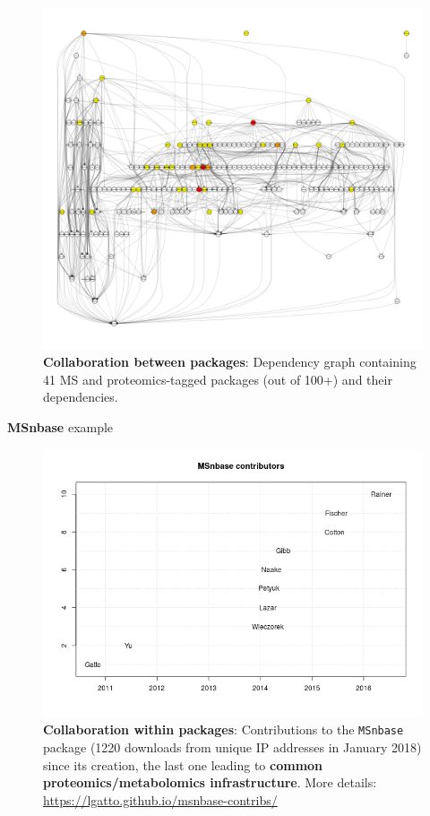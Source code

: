 \begin{frame}
  \begin{figure}[h]
    \centering
    \includegraphics[width=.8\linewidth]{./figs/g.png}
    \caption{\textbf{Collaboration between packages}: Dependency graph
      containing 41 MS and proteomics-tagged packages (out of 100+)
      and their dependencies. }
  \end{figure}
\end{frame}

\begin{frame}{\textbf{MSnbase} example}

  \begin{figure}[h]
    \centering
    \includegraphics[width=.8\linewidth]{./figs/msnbase-contributors-2.png}
    \caption{\textbf{Collaboration within packages}: Contributions to the
      \texttt{MSnbase} package (1220 downloads from unique IP
      addresses in January 2018) since its creation, the last one
      leading to \textbf{common proteomics/metabolomics
        infrastructure}. More details:
      \url{https://lgatto.github.io/msnbase-contribs/}}
    \label{fig:msnbase}
  \end{figure}

\end{frame}

